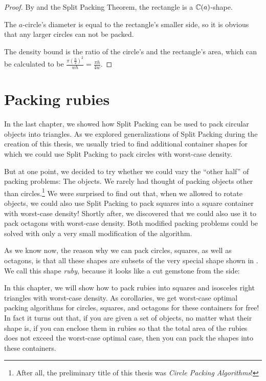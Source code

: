 \documentclass[a4paper,style=print,oneside,bibliography=totoc,nexus,lnum,extramargin]{tubsbook}
\begin{document}
\begin{proof}
    By  and the Split Packing Theorem, the rectangle is a $\mathbb{C}(a)$-shape.

    The $a$-circle's diameter is equal to the rectangle's smaller side, so it is obvious that any larger circles can not be packed.

    The density bound is the ratio of the circle's and the rectangle's area, which can be calculated to be $\frac{\pi (\frac{h}{2})^2}{wh} = \frac{\pi h}{4w}$.
\end{proof}


\chapter{Packing rubies}\label{ch:rubies}

In the last chapter, we showed how Split Packing can be used to pack circular objects into triangles.
As we explored generalizations of Split Packing during the creation of this thesis, we usually tried to find additional container shapes for which we could use Split Packing to pack circles with worst-case density. 

But at one point, we decided to try whether we could vary the “other half” of packing problems: The objects. We rarely had thought of packing objects other than circles.\footnote{After all, the preliminary title of this thesis was \emph{Circle Packing Algorithms}!} 
We were surprised to find out that, when we allowed to rotate objects, we could also use Split Packing to pack squares into a square container with worst-case density! Shortly after, we discovered that we could also use it to pack octagons with worst-case density. Both modified packing problems could be solved with only a very small modification of the algorithm.

As we know now, the reason why we can pack circles, squares, as well as octagons, is that all these shapes are subsets of the very special shape shown in . We call this shape \emph{ruby}, because it looks like a cut gemstone from the side:


In this chapter, we will show how to pack rubies into squares and isosceles right triangles with worst-case density. As corollaries, we get worst-case optimal packing algorithms for circles, squares, and octagons for these containers for free!
In fact it turns out that, if you are given a set of objects, no matter what their shape is, if you can enclose them in rubies so that the total area of the rubies does not exceed the worst-case optimal case, then you can pack the shapes into these containers.
\end{document}
